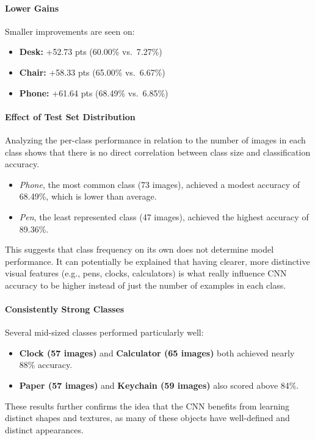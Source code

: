 \documentclass[10pt]{article}
\begin{document}
\paragraph{Lower Gains}  
Smaller improvements are seen on:
\begin{itemize}
  \item \textbf{Desk:} +52.73 pts (60.00\% vs.\ 7.27\%)
  \item \textbf{Chair:} +58.33 pts (65.00\% vs.\ 6.67\%)
  \item \textbf{Phone:} +61.64 pts (68.49\% vs.\ 6.85\%)
\end{itemize}

\paragraph{Effect of Test Set Distribution}
Analyzing the per-class performance in relation to the number of images in each class shows that there is no direct correlation between class size and classification accuracy.
\begin{itemize}
  \item \emph{Phone}, the most common class (73 images), achieved a modest accuracy of 68.49\%, which is lower than average.
  \item \emph{Pen}, the least represented class (47 images), achieved the highest accuracy of 89.36\%.
\end{itemize}
This suggests that class frequency on its own does not determine model performance. It can potentially be explained that having clearer, more distinctive visual features (e.g., pens, clocks, calculators)
is what really influence CNN accuracy to be higher instead of just the number of examples in each class.

\paragraph{Consistently Strong Classes}
Several mid-sized classes performed particularly well:
\begin{itemize}
  \item \textbf{Clock (57 images)} and \textbf{Calculator (65 images)} both achieved nearly 88\% accuracy.
  \item \textbf{Paper (57 images)} and \textbf{Keychain (59 images)} also scored above 84\%.
\end{itemize}
These results further confirms the idea that the CNN benefits from learning distinct shapes and textures, as many of these objects have well-defined and distinct appearances.
\end{document}
